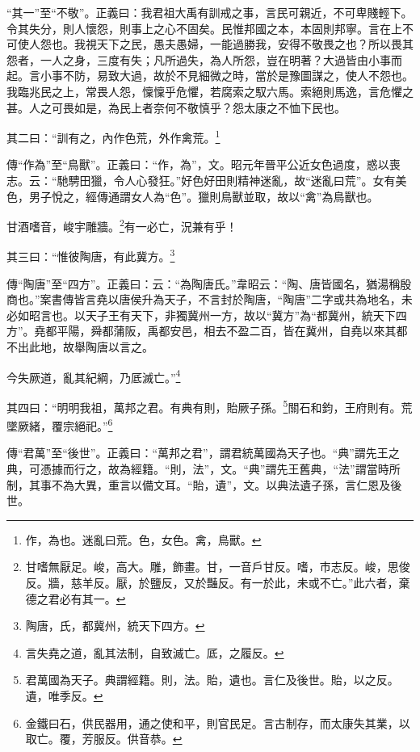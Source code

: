 {\noindent\shu{}\fzkt “其一”至“不敬”。正義曰：我君祖大禹有訓戒之事，言民可親近，不可卑賤輕下。令其失分，則人懷怨，則事上之心不固矣。民惟邦國之本，本固則邦寧。言在上不可使人怨也。我視天下之民，愚夫愚婦，一能過勝我，安得不敬畏之也？所以畏其怨者，一人之身，三度有失；凡所過失，為人所怨，豈在明著？大過皆由小事而起。言小事不防，易致大過，故於不見細微之時，當於是豫圖謀之，使人不怨也。我臨兆民之上，常畏人怨，懍懍乎危懼，若腐索之馭六馬。索絕則馬逸，言危懼之甚。人之可畏如是，為民上者奈何不敬慎乎？怨太康之不恤下民也。 \par}

其二曰：“訓有之，內作色荒，外作禽荒。\footnote{作，為也。迷亂曰荒。色，女色。禽，鳥獸。}

{\noindent\zhuan{}\fzbyks 傳“作為”至“鳥獸”。正義曰：“作，為”，文。昭元年晉平公近女色過度，惑以喪志。云：“馳騁田獵，令人心發狂。”好色好田則精神迷亂，故“迷亂曰荒”。女有美色，男子悅之，經傳通謂女人為“色”。獵則鳥獸並取，故以“禽”為鳥獸也。 \par}

甘酒嗜音，峻宇雕牆。\footnote{甘嗜無厭足。峻，高大。雕，飾畫。甘，一音戶甘反。嗜，市志反。峻，思俊反。牆，慈羊反。厭，於鹽反，又於豔反。有一於此，未或不亡。”此六者，棄德之君必有其一。}有一必亡，況兼有乎！

其三曰：“惟彼陶唐，有此冀方。\footnote{陶唐，氏，都冀州，統天下四方。}

{\noindent\zhuan{}\fzbyks 傳“陶唐”至“四方”。正義曰：云：“為陶唐氏。”韋昭云：“陶、唐皆國名，猶湯稱殷商也。”案書傳皆言堯以唐侯升為天子，不言封於陶唐，“陶唐”二字或共為地名，未必如昭言也。以天子王有天下，非獨冀州一方，故以“冀方”為“都冀州，統天下四方”。堯都平陽，舜都蒲阪，禹都安邑，相去不盈二百，皆在冀州，自堯以來其都不出此地，故舉陶唐以言之。 \par}

今失厥道，亂其紀綱，乃厎滅亡。”\footnote{言失堯之道，亂其法制，自致滅亡。厎，之履反。}

其四曰：“明明我祖，萬邦之君。有典有則，貽厥子孫。\footnote{君萬國為天子。典謂經籍。則，法。貽，遺也。言仁及後世。貽，以之反。遺，唯季反。}關石和鈞，王府則有。荒墜厥緒，覆宗絕祀。”\footnote{金鐵曰石，供民器用，通之使和平，則官民足。言古制存，而太康失其業，以取亡。覆，芳服反。供音恭。}


{\noindent\zhuan{}\fzbyks 傳“君萬”至“後世”。正義曰：“萬邦之君”，謂君統萬國為天子也。“典”謂先王之典，可憑據而行之，故為經籍。“則，法”，文。“典”謂先王舊典，“法”謂當時所制，其事不為大異，重言以備文耳。“貽，遺”，文。以典法遺子孫，言仁恩及後世。 \par}

